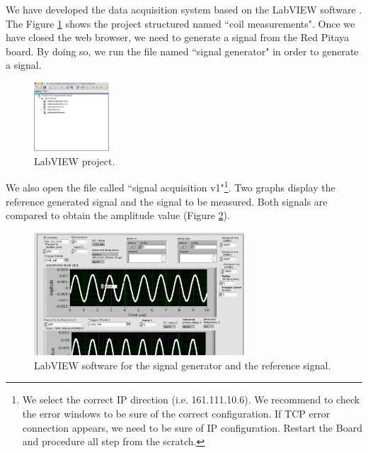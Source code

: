 \documentclass[12pt]{extarticle}
\begin{document}
We have developed the data acquisition system based on the LabVIEW software \cite{labview}. The Figure \ref{fig:project} shows the project structured named ``coil measurements". Once we have closed the web browser, we need to generate a signal from the Red Pitaya board. By doing so, we run the file named ``signal generator"  in order to generate a signal.

\begin{figure}%
	\begin{center}
		\includegraphics[width=0.25\textwidth]{images2/project} 
		\caption{LabVIEW project.}
		\label{fig:project}
	\end{center}
\end{figure}

We also open the file called ``signal acquisition v1"\footnote{We select the correct IP direction (i.e. 161.111.10.6). We recommend to check the error windows to be sure of the correct configuration. If TCP error connection appears, we need to be sure of IP configuration. Restart the Board and procedure all step from the scratch.}. Two graphs display the reference generated signal and the signal to be measured. Both signals are compared to obtain the amplitude value (Figure \ref{fig:labview1}). 


\begin{figure}[!h]
	\begin{center}
		\includegraphics[width=0.7\textwidth]{images2/labview1} 
		\caption{LabVIEW software for the signal generator and the reference signal.}
		\label{fig:labview1}
	\end{center}
\end{figure}
\end{document}
